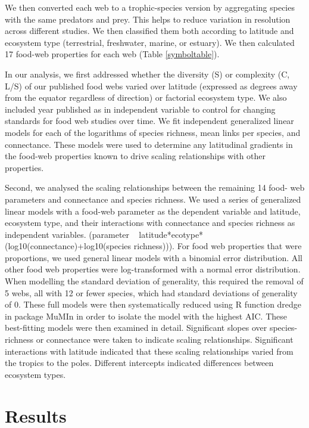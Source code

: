 \documentclass[12pt]{article}
\begin{document}
We then converted each web to a trophic-species version by aggregating species
with the same predators and prey. This helps to reduce variation in resolution
across different studies.
We then classified them both according to latitude
and ecosystem type (terrestrial, freshwater, marine, or estuary). We then calculated 17
food-web properties for each web (Table \ref{symboltable}).


In our analysis, we first addressed whether the diversity (S) or complexity (C, L/S) of our
published food webs varied over latitude (expressed as degrees away from the
equator regardless of direction) or factorial ecosystem type. We also included
year published as in independent variable to control for changing standards
for food web studies over time. We fit independent generalized linear models
for each of the logarithms of species richness, mean links per species, and
connectance. These models were used to determine any latitudinal gradients in the food-web
properties known to drive scaling relationships with other properties.


Second, we analysed the scaling relationships between the remaining 14 food-
web parameters and connectance and species richness. We used a series of
generalized linear models with a food-web parameter as the dependent variable
and latitude, ecosystem type, and their interactions with connectance and
species richness as independent variables. (parameter ~
latitude*ecotype*(log10(connectance)+log10(species richness))). For food web
properties that were proportions, we used general linear models with a
binomial error distribution. All other food web properties were log-transformed with a normal error distribution.
When modelling the standard deviation of generality, this
required the removal of 5 webs, all with 12 or fewer species, which had
standard deviations of generality of 0. These full models were then
systematically reduced using R function dredge \cite{} in package MuMIn
\cite{} in order to isolate the model with the highest AIC. These best-fitting models were 
then examined in detail. Significant slopes over species-richness or connectance were taken to indicate scaling
relationships. Significant interactions with latitude indicated that these scaling relationships varied from the tropics
to the poles. Different intercepts indicated differences between ecosystem types.


\section*{Results}
\end{document}
